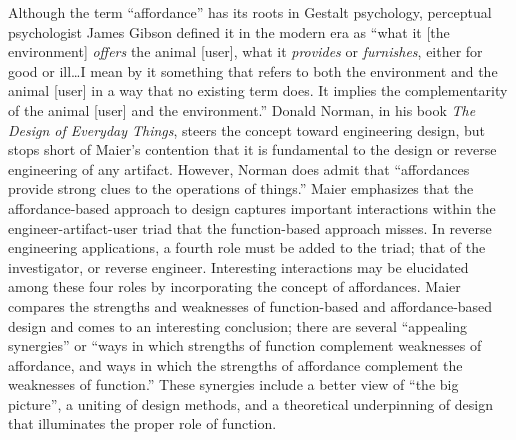 Although the term “affordance” has its roots in Gestalt
psychology\citep{koffka1935}, perceptual psychologist James Gibson
defined it in the modern era as “what it [the environment]
\textit{offers} the animal [user], what it \textit{provides} or
\textit{furnishes}, either for good or ill…I mean by it something that
refers to both the environment and the animal [user] in a way that no
existing term does. It implies the complementarity of the animal [user]
and the environment.”\citep[][pg. 127]{gibson1979} Donald Norman, in his book
\textit{The Design of Everyday Things}\citep{norman1988}, steers the
concept toward engineering design, but stops short of Maier’s
contention that it is fundamental to the design or reverse engineering
of any artifact. However, Norman does admit that “affordances provide
strong clues to the operations of things.” Maier emphasizes that the
affordance-based approach to design captures important interactions
within the engineer-artifact-user triad that the function-based
approach misses. In reverse engineering applications, a fourth role
must be added to the triad; that of the investigator, or reverse
engineer. Interesting interactions may be elucidated among these four
roles by incorporating the concept of affordances. Maier compares the
strengths and weaknesses of function-based and affordance-based design
and comes to an interesting conclusion; there are several “appealing
synergies” or “ways in which strengths of function complement
weaknesses of affordance, and ways in which the strengths of affordance
complement the weaknesses of function.”\citep{maierfadel2002} These
synergies include a better view of “the big picture”, a uniting of
design methods, and a theoretical underpinning of design that
illuminates the proper role of function.


